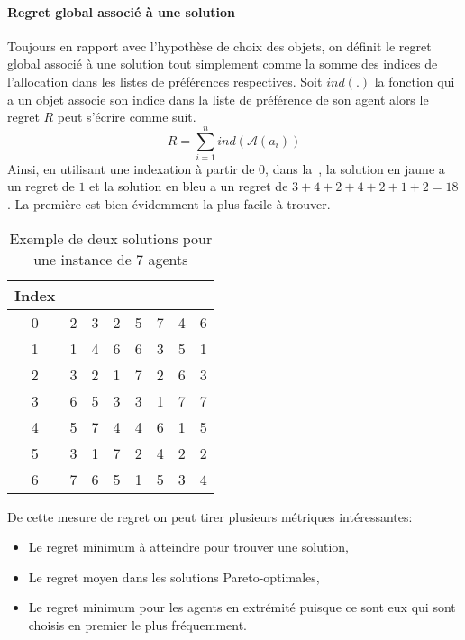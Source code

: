 \documentclass[a4paper, 11pt]{article}
\newcommand{\yy}[1]{\colorbox{yellow!70}{#1}}
\newcommand{\bb}[1]{\colorbox{blue!30}{#1}}
\begin{document}
	\paragraph{Regret global associé à une solution}{Toujours en rapport avec l'hypothèse de choix des objets, on définit le regret global associé à une solution tout simplement comme la somme des indices de l'allocation dans les listes de préférences respectives. Soit $ind(.)$ la fonction qui a un objet associe son indice dans la liste de préférence de son agent alors le regret $R$ peut s'écrire comme suit.
	\begin{equation*}
	    R = \sum_{i=1}^n ind(\mathcal{A}(a_i))
	\end{equation*}
	Ainsi, en utilisant une indexation à partir de $0$, dans la~, la solution en \yy{jaune} a un regret de $1$ et la solution en \bb{bleu} a un regret de $3+4+2+4+2+1+2=18$. La première est bien évidemment la plus facile à trouver. 
	
	\begin{table}[h!]
	    \centering
		\begin{tabular}{c|c c c c c c c}
		    \textbf{Index} \\
			\hline
			0&    2	& \yy{3}	& \yy{2}	& \yy{5} & \yy{7}	& \yy{4}	& \yy{6}	\\ 
    		1&  \yy{1} &  4    &  6	&  6	&  3    & \bb{5}&  1	\\ 
			2&    3	&  2	& \bb{1}&  7	& \bb{2}&  6    & \bb{3}\\ 
			3& \bb{6}	&  5	&  3	&  3    &  1	&  7	&  7	\\ 
			4&    5	& \bb{7}&  4	& \bb{4}&  6	&  1	&  5	\\ 
			5&    3	&  1	&  7	&  2	&  4	&  2	&  2	\\ 
			6&    7	&  6	&  5	&  1	&  5	&  3	&  4    \\ 
			\hline
		\end{tabular}
		\caption{Exemple de deux solutions pour une instance de 7 agents}
		\label{fig-exemple1}
	\end{table}
	
	De cette mesure de regret on peut tirer plusieurs métriques intéressantes:
	\begin{itemize}
	    \item Le regret minimum à atteindre pour trouver une solution,
	    \item Le regret moyen dans les solutions Pareto-optimales,
	    \item Le regret minimum pour les agents en extrémité puisque ce sont eux qui sont choisis en premier le plus fréquemment.
	\end{itemize}
}
\end{document}
